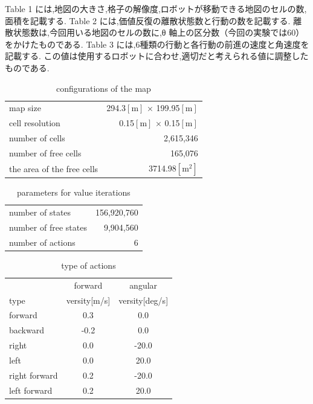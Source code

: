 \documentclass{jarticle}
\begin{document}
Table 1 には,地図の大きさ,格子の解像度,ロボットが移動できる地図のセルの数,面積を記載する.
Table 2 には,価値反復の離散状態数と行動の数を記載する.
離散状態数は,今回用いる地図のセルの数に,θ 軸上の区分数（今回の実験では60）をかけたものである.
Table 3 には,6種類の行動と各行動の前進の速度と角速度を記載する.
この値は使用するロボットに合わせ,適切だと考えられる値に調整したものである.

\begin{table}[hbtp]
  \caption{conﬁgurations of the map}
  \centering
  \begin{tabular}{l|r}
    \hline
    map size & 294.3$\mathrm{[m]}$ × 199.95$\mathrm{[m]}$\\
    cell resolution &  0.15$\mathrm{[m]}$ × 0.15$\mathrm{[m]}$ \\
		number of cells & 2,615,346\\
    number of free cells & 165,076\\
		the area of the free cells & 3714.98$\mathrm{[m^2]}$\\
    \hline
  \end{tabular}
\end{table}

\begin{table}[hbtp]
	\caption{parameters for value iterations}
  \centering
  \begin{tabular}{l|r}
    \hline
    number of states & 156,920,760\\
    number of free states &  9,904,560\\
		number of actions & 6\\
    \hline
  \end{tabular}
\end{table}

\begin{table}[hbtp]
	\caption{type of actions}
	\centering
	\begin{tabular}{l|cc}
 		\hline
		& forward & angular \\
 		type & versity[m/s] & versity[deg/s] \\
 		\hline \hline
 		forward & 0.3 & 0.0 \\
 		backward & -0.2 & 0.0 \\
 		right & 0.0 & -20.0 \\
 		left & 0.0 & 20.0 \\
 		right forward & 0.2 & -20.0 \\
 		left forward & 0.2 & 20.0 \\
	 \hline
	\end{tabular}
\end{table}
\end{document}
